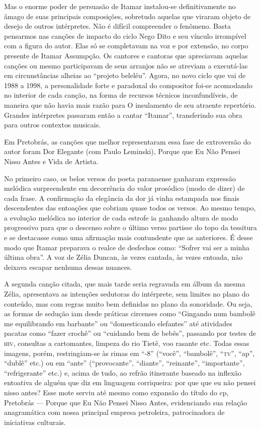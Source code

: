 Mas o enorme poder de persuasão de Itamar instalou-se definitivamente no
âmago de suas principais composições, sobretudo aquelas que viraram
objeto de desejo de outros intérpretes. Não é difícil compreender o
fenômeno. Basta pensarmos nas canções de impacto do ciclo Nego Dito e
seu vínculo irrompível com a figura do autor. Elas só se completavam na
voz e por extensão, no corpo presente de Itamar Assumpção. Os cantores e
cantoras que apreciavam aquelas canções ou mesmo participavam de seus
arranjos não se atreviam a executá-las em circunstâncias alheias ao
``projeto beleléu''. Agora, no novo ciclo que vai de 1988 a 1998, a
personalidade forte e paradoxal do compositor foi-se acomodando no
interior de cada canção, na forma de recursos técnicos inconfundíveis,
de maneira que não havia mais razão para O insulamento de seu atraente
repertório. Grandes intérpretes passaram então a cantar ``Itamar'',
transferindo sua obra para outros contextos musicais.

Em Pretobrás, as canções que melhor representaram essa fase de
extroversão do autor foram Dor Elegante (com Paulo Leminski), Porque que
Eu Não Pensei Nisso Antes e Vida de Artista.

No primeiro caso, os belos versos do poeta paranaense ganharam expressão
melódica surpreendente em decorrência do valor prosódico (modo de dizer)
de cada frase. A confirmação da elegância da dor já vinha estampada nos
finais descendentes das entoações que cobriam quase todos os versos. Ao
mesmo tempo, a evolução melódica no interior de cada estrofe ia ganhando
altura de modo progressivo para que o descenso sobre o último verso
partisse do topo da tessitura e se destacasse como uma afirmação mais
contundente que as anteriores. É desse modo que Itamar preparava o
realce de desfechos como: ``Sofrer vai ser a minha última obra''. A voz
de Zélia Duncan, às vezes cantada, às vezes entoada, não deixava escapar
nenhuma dessas nuances.

A segunda canção citada, que mais tarde seria regravada em álbum da
mesma Zélia, apresentava as intenções sedutoras do intérprete, sem
limites no plano do conteúdo, mas com regras muito bem definidas no
plano da sonoridade. Ou seja, as formas de sedução iam desde práticas
circenses como ``Gingando num bambolê me equilibrando em barbante'' ou
``domesticando elefantes'' até atividades pacatas como ``fazer crochê''
ou ``cuidando bem de bebês'', passando por testes de \textsc{hiv}, consultas a
cartomantes, limpeza do rio Tietê, voo rasante etc. Todas essas imagens,
porém, restringiam-se às rimas em ``-8'' (``você'', ``bambolê'', ``\textsc{tv}'',
``ap'', ``dublê'' etc.) ou em ``ante'' (``provocante'', ``diante'',
``reinante'', ``importante'', ``refrigerante'' etc.) e, acima de tudo,
ao refrão itinerante baseado na inflexão entoativa de alguém que diz em
linguagem corriqueira: por que que eu não pensei nisso antes? Esse mote
serviu até mesmo como expansão do título do cp, Pretobrás --- Porque que
Eu Não Pensei Nisso Antes, evidenciando sua relação anagramática com
nossa principal empresa petroleira, patrocinadora de iniciativas
culturais.

